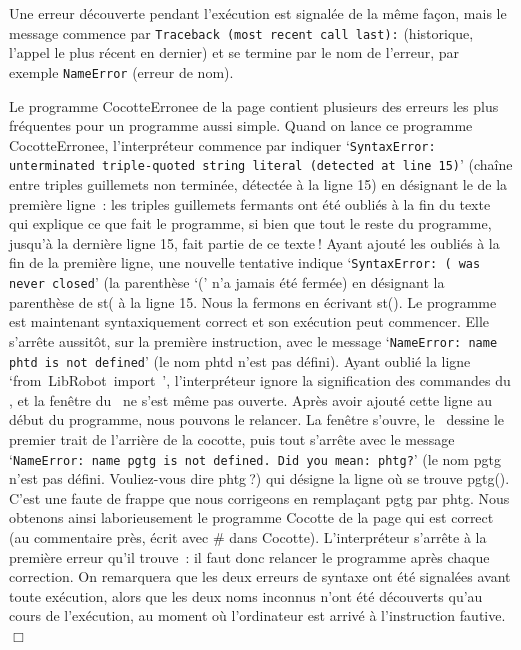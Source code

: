 Une erreur découverte pendant l'exécution est signalée de la même façon, mais le 
message commence par {\tt Traceback (most recent call last):} (historique, l'appel le plus 
récent en dernier) et se termine par le nom de l'erreur, par exemple {\tt NameError} 
(erreur de nom).

\begin{exemple}{\rm
\hfill Le pro\-gram\-me {\idt CocotteErronee} de la page 
\pageref{prog:Cocotte-errone}
contient plusieurs des erreurs les plus fréquentes pour
un programme aussi simple.
Quand on lance ce programme {\idt CocotteErronee}, l'interpréteur commence par indiquer
`{\tt SyntaxError: unterminated triple-quoted string literal (detected at line 15)}' 
(chaîne entre triples guillemets non terminée, détectée à la ligne 15) en désignant 
le {\cha {}} de la 
première ligne~: les triples guillemets fermants ont été oubliés à la fin du 
texte qui explique ce que fait le programme, si bien que tout le reste du 
programme, jusqu'à la dernière ligne 15, fait partie de ce texte$\:$!
Ayant ajouté les {\cha {}} oubliés à la fin de la première ligne, 
une nouvelle tentative indique
`{\tt SyntaxError: \textquotesingle{}(\textquotesingle{} was never closed}' (la parenthèse `{\idt (}' n'a jamais été fermée) 
en désignant la parenthèse de {\idt st(} à la ligne 15. Nous la fermons en écrivant {\idt st()}.
Le programme est maintenant syntaxiquement correct et son exécution peut commencer. 
Elle s'arrête aussitôt, sur la première instruction, avec le message 
`{\tt NameError: name \textquotesingle{}phtd\textquotesingle{} is not defined}' (le nom {\idt phtd} n'est pas défini). 
Ayant oublié la ligne `{\mcl from}\ {\idt LibRobot}\ {\mcl import}\ {\idt *}', 
l'interpréteur ignore la signification des commandes du \robotErr, et la fenêtre 
du \robot\ ne s'est même pas ouverte. 
Après avoir ajouté cette ligne au début du programme, nous pouvons le relancer.
La fenêtre s'ouvre, le \robot\ dessine le premier trait de l'arrière de la cocotte, 
puis tout s'arrête avec le message 
`{\tt NameError: name \textquotesingle{}pgtg\textquotesingle{} is not defined. Did you mean: \textquotesingle{}phtg\textquotesingle{}?}' 
(le nom {\idt pgtg} n'est pas défini. Vouliez-vous dire {\idt phtg}$\:$?) qui désigne la 
ligne où se trouve {\idt pgtg()}. C'est une faute de
frappe que nous corrigeons en remplaçant {\idt  pgtg} par {\idt  phtg}. 
Nous obtenons ainsi laborieusement le programme {\idt Cocotte} de la page 
\pageref{prog:Cocotte} qui est correct (au commentaire près, écrit avec {\cmt \#} dans {\idt Cocotte}).
L'interpréteur s'arrête à la première erreur qu'il trouve~: il faut donc 
relancer le programme après chaque correction. On remarquera que les deux erreurs 
de syntaxe ont été signalées avant toute exécution, alors que les deux noms inconnus 
n'ont été découverts qu'au cours de l'exécution, au moment où l'or\-di\-na\-teur est arrivé 
à l'instruction fautive.
\noindent $\Box$ }\end{exemple}


